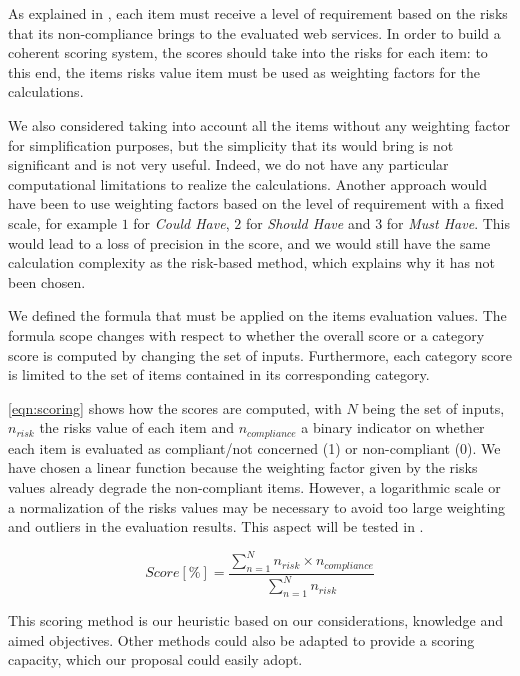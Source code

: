 As explained in , each item must receive a level of requirement based on the risks that its non-compliance brings to the evaluated web services. In order to build a coherent scoring system, the scores should take into the risks for each item: to this end, the items risks value item must be used as weighting factors for the calculations.

We also considered taking into account all the items without any weighting factor for simplification purposes, but the simplicity that its would bring is not significant and is not very useful. Indeed, we do not have any particular computational limitations to realize the calculations. Another approach would have been to use weighting factors based on the level of requirement with a fixed scale, for example $1$ for \textit{Could Have}, $2$ for \textit{Should Have} and $3$ for \textit{Must Have}. This would lead to a loss of precision in the score, and we would still have the same calculation complexity as the risk-based method, which explains why it has not been chosen.

We defined the formula that must be applied on the items evaluation values. The formula scope changes with respect to whether the overall score or a category score is computed by changing the set of inputs. Furthermore, each category score is limited to the set of items contained in its corresponding category.

\autoref{eqn:scoring} shows how the scores are computed, with $N$ being the set of inputs, $n_{risk}$ the risks value of each item and $n_{compliance}$ a binary indicator on whether each item is evaluated as compliant/not concerned (1) or non-compliant (0). We have chosen a linear function because the weighting factor given by the risks values already degrade the non-compliant items. However, a logarithmic scale or a normalization of the risks values may be necessary to avoid too large weighting and outliers in the evaluation results. This aspect will be tested in .

\begin{equation}
    \label{eqn:scoring}
     Score [\%] = \frac{\sum\limits_{n = 1}^{N} n_{risk} \times n_{compliance}}{\sum\limits_{n = 1}^{N} n_{risk}}
\end{equation}

This scoring method is our heuristic based on our considerations, knowledge and aimed objectives. Other methods could also be adapted to provide a scoring capacity, which our proposal could easily adopt.


